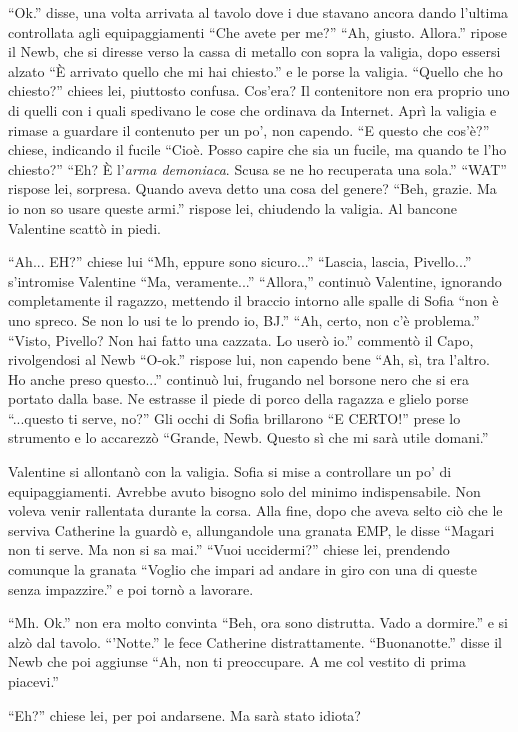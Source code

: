     ``Ok.'' disse, una volta arrivata al tavolo dove i due stavano ancora dando l'ultima controllata agli
    equipaggiamenti ``Che avete per me?'' ``Ah, giusto. Allora.'' ripose il Newb, che si diresse verso la cassa di
    metallo con sopra la valigia, dopo essersi alzato ``È arrivato quello che mi hai chiesto.'' e le porse la valigia.
    ``Quello che ho chiesto?'' chiees lei, piuttosto confusa. Cos'era? Il contenitore non era proprio uno di quelli con
    i quali spedivano le cose che ordinava da Internet. Aprì la valigia e rimase a guardare il contenuto per un po', non
    capendo. ``E questo che cos'è?'' chiese, indicando il fucile ``Cioè. Posso capire che sia un fucile, ma quando te
    l'ho chiesto?'' ``Eh? È l'\emph{arma demoniaca}. Scusa se ne ho recuperata una sola.'' ``WAT'' rispose lei,
    sorpresa. Quando aveva detto una cosa del genere? ``Beh, grazie. Ma io non so usare queste armi.'' rispose lei,
    chiudendo la valigia. Al bancone Valentine scattò in piedi.

    ``Ah... EH?'' chiese lui ``Mh, eppure sono sicuro...'' ``Lascia, lascia, Pivello...'' s'intromise Valentine ``Ma,
    veramente...'' ``Allora,'' continuò Valentine, ignorando completamente il ragazzo, mettendo il braccio intorno alle
    spalle di Sofia ``non è uno spreco. Se non lo usi te lo prendo io, BJ.'' ``Ah, certo, non c'è problema.'' ``Visto,
    Pivello? Non hai fatto una cazzata. Lo userò io.'' commentò il Capo, rivolgendosi al Newb ``O-ok.'' rispose lui, non
    capendo bene ``Ah, sì, tra l'altro. Ho anche preso questo...'' continuò lui, frugando nel borsone nero che si era
    portato dalla base. Ne estrasse il piede di porco della ragazza e glielo porse ``...questo ti serve, no?'' Gli occhi
    di Sofia brillarono ``E CERTO!'' prese lo strumento e lo accarezzò ``Grande, Newb. Questo sì che mi sarà utile
    domani.''

    Valentine si allontanò con la valigia. Sofia si mise a controllare un po' di equipaggiamenti. Avrebbe avuto bisogno
    solo del minimo indispensabile. Non voleva venir rallentata durante la corsa. Alla fine, dopo che aveva selto ciò
    che le serviva Catherine la guardò e, allungandole una granata EMP, le disse ``Magari non ti serve. Ma non si sa
    mai.'' ``Vuoi uccidermi?'' chiese lei, prendendo comunque la granata ``Voglio che impari ad andare in giro con una
    di queste senza impazzire.'' e poi tornò a lavorare.

    ``Mh. Ok.'' non era molto convinta ``Beh, ora sono distrutta. Vado a dormire.'' e si alzò dal tavolo. ``'Notte.'' le
    fece Catherine distrattamente. ``Buonanotte.'' disse il Newb che poi aggiunse ``Ah, non ti preoccupare. A me col
    vestito di prima piacevi.''

    ``Eh?'' chiese lei, per poi andarsene. Ma sarà stato idiota?
